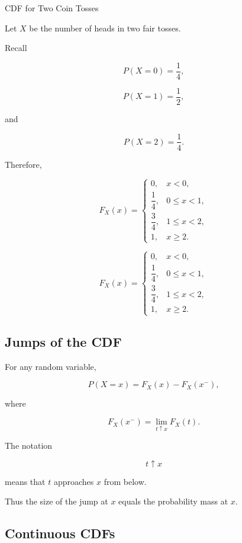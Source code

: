 \begin{workedexamplebox}{CDF for Two Coin Tosses}

Let \(X\) be the number of heads in two fair tosses.

Recall

\[
P(X=0)=\frac14,
\]

\[
P(X=1)=\frac12,
\]

and

\[
P(X=2)=\frac14.
\]

Therefore,

\[
F_X(x)
=
\begin{cases}
0,&x<0,\\[1mm]
\dfrac14,&0\leq x<1,\\[2mm]
\dfrac34,&1\leq x<2,\\[2mm]
1,&x\geq2.
\end{cases}
\]

\begin{answerbox}
\[
\boxed{
F_X(x)
=
\begin{cases}
0,&x<0,\\
\dfrac14,&0\leq x<1,\\
\dfrac34,&1\leq x<2,\\
1,&x\geq2.
\end{cases}
}
\]
\end{answerbox}

\end{workedexamplebox}

\subsection{Jumps of the CDF}
\label{subsec:cdf-jumps}

For any random variable,

\[
\boxed{
P(X=x)
=
F_X(x)-F_X(x^-),
}
\]

where

\[
F_X(x^-)
=
\lim_{t\uparrow x}F_X(t).
\]

The notation

\[
t\uparrow x
\]

means that \(t\) approaches \(x\) from below.

Thus the size of the jump at \(x\) equals the probability mass at
\(x\).

\subsection{Continuous CDFs}
\label{subsec:continuous-cdfs}

